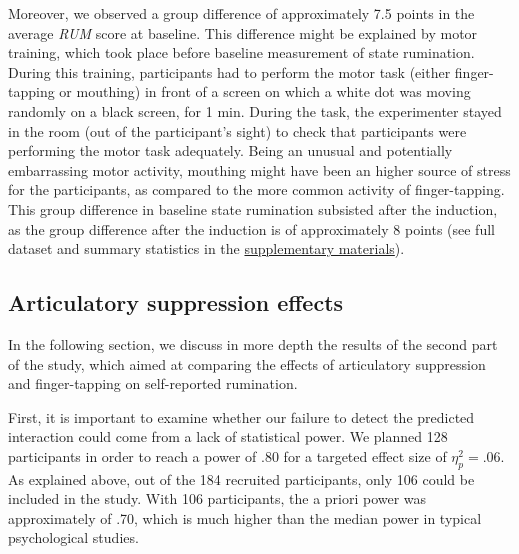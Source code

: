 \documentclass[12pt,]{book}
\theoremstyle{definition}
\theoremstyle{definition}
\theoremstyle{definition}
\theoremstyle{remark}
\begin{document}
Moreover, we observed a group difference of approximately 7.5 points in
the average \emph{RUM} score at baseline. This difference might be
explained by motor training, which took place before baseline
measurement of state rumination. During this training, participants had
to perform the motor task (either finger-tapping or mouthing) in front
of a screen on which a white dot was moving randomly on a black screen,
for 1 min. During the task, the experimenter stayed in the room (out of
the participant's sight) to check that participants were performing the
motor task adequately. Being an unusual and potentially embarrassing
motor activity, mouthing might have been an higher source of stress for
the participants, as compared to the more common activity of
finger-tapping. This group difference in baseline state rumination
subsisted after the induction, as the group difference after the
induction is of approximately 8 points (see full dataset and summary
statistics in the \protect\hyperlink{supp}{supplementary materials}).

\subsection{Articulatory suppression
effects}\label{articulatory-suppression-effects-1}

In the following section, we discuss in more depth the results of the
second part of the study, which aimed at comparing the effects of
articulatory suppression and finger-tapping on self-reported rumination.

First, it is important to examine whether our failure to detect the
predicted interaction could come from a lack of statistical power. We
planned 128 participants in order to reach a power of .80 for a targeted
effect size of \(\eta_{p}^{2}=.06\). As explained above, out of the 184
recruited participants, only 106 could be included in the study. With
106 participants, the a priori power was approximately of .70, which is
much higher than the median power in typical psychological studies.
\end{document}
